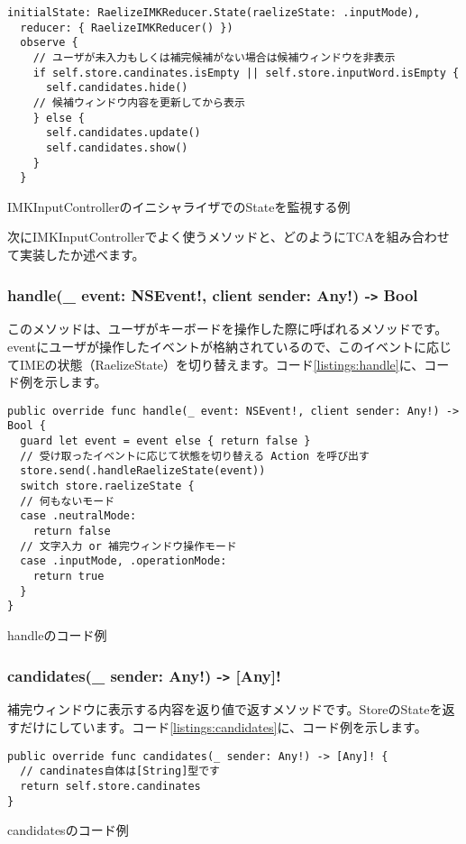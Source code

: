 \documentclass[uplatex,a4j,12pt,twocolumn]{jsarticle}
\begin{document}
\begin{listing}[H]
  \begin{verbatim}
initialState: RaelizeIMKReducer.State(raelizeState: .inputMode),
  reducer: { RaelizeIMKReducer() })
  observe {
    // ユーザが未入力もしくは補完候補がない場合は候補ウィンドウを非表示
    if self.store.candinates.isEmpty || self.store.inputWord.isEmpty {
      self.candidates.hide()
    // 候補ウィンドウ内容を更新してから表示
    } else {
      self.candidates.update()
      self.candidates.show()
    }
  }
  \end{verbatim}
  \caption{IMKInputControllerのイニシャライザでのStateを監視する例}\label{listings:initial_state}
\end{listing}
次にIMKInputControllerでよく使うメソッドと、どのようにTCAを組み合わせて実装したか述べます。
\subsubsection{handle(\_ event: NSEvent!, client sender: Any!) -\texttt{>} Bool}
このメソッドは、ユーザがキーボードを操作した際に呼ばれるメソッドです。eventにユーザが操作したイベントが格納されているので、このイベントに応じてIMEの状態（RaelizeState）を切り替えます。コード\ref{listings:handle}に、コード例を示します。
\begin{listing}[h]
  \begin{verbatim}
public override func handle(_ event: NSEvent!, client sender: Any!) -> Bool {
  guard let event = event else { return false }
  // 受け取ったイベントに応じて状態を切り替える Action を呼び出す
  store.send(.handleRaelizeState(event))
  switch store.raelizeState {
  // 何もないモード
  case .neutralMode:
    return false
  // 文字入力 or 補完ウィンドウ操作モード  
  case .inputMode, .operationMode:
    return true
  }
}
  \end{verbatim}
  \caption{handleのコード例}\label{listings:handle}
\end{listing}

\subsubsection{candidates(\_ sender: Any!) -\texttt{>} [Any]!}
補完ウィンドウに表示する内容を返り値で返すメソッドです。StoreのStateを返すだけにしています。コード\ref{listings:candidates}に、コード例を示します。
\begin{listing}[h]
  \begin{verbatim}
public override func candidates(_ sender: Any!) -> [Any]! {
  // candinates自体は[String]型です
  return self.store.candinates
}
  \end{verbatim}
  \caption{candidatesのコード例}\label{listings:candidates}
\end{listing}
\end{document}
